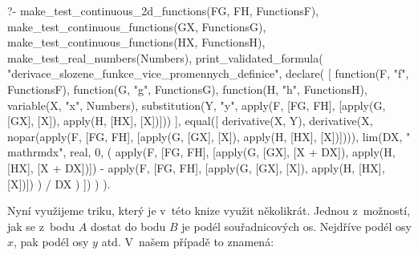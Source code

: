 \begin{prolog}
?-	make_test_continuous_2d_functions(FG, FH, FunctionsF),
	make_test_continuous_functions(GX, FunctionsG),
	make_test_continuous_functions(HX, FunctionsH),
	make_test_real_numbers(Numbers),
	print_validated_formula(
		"derivace_slozene_funkce_vice_promennych_definice",
		declare(
			[
				function(F, "f", FunctionsF),
				function(G, "g", FunctionsG),
				function(H, "h", FunctionsH),
				variable(X, "x", Numbers),
				substitution(Y, "y", apply(F, [FG, FH], [apply(G, [GX], [X]), apply(H, [HX], [X])]))
			],
			equal([
				derivative(X, Y),
				derivative(X, nopar(apply(F, [FG, FH], [apply(G, [GX], [X]), apply(H, [HX], [X])]))),
				lim(DX, "\\mathrm{d}x", real, 0,
					(
						apply(F, [FG, FH], [apply(G, [GX], [X + DX]), apply(H, [HX], [X + DX])]) -
						apply(F, [FG, FH], [apply(G, [GX], [X]), apply(H, [HX], [X])])
					) / DX
				)
			])
		)
	).
\end{prolog}

Nyní využijeme triku, který je v~této knize využit několikrát. Jednou z~možností, jak se z~bodu \(A\) dostat do bodu \(B\) je podél souřadnicových os. Nejdříve podél osy \(x\), pak podél osy \(y\) atd. V~našem případě to znamená:


